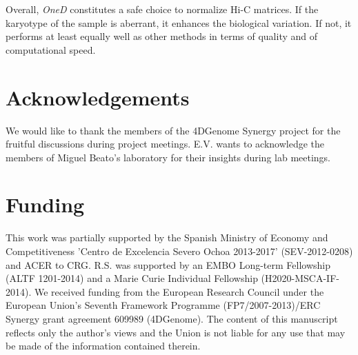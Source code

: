 \documentclass{bioinfo}
\begin{document}
Overall, \textit{OneD} constitutes a safe choice to normalize Hi-C
matrices. If the karyotype of the sample is aberrant, it enhances the
biological variation.  If not, it performs at least equally well as other
methods in terms of quality and of computational speed.


\section*{Acknowledgements}

We would like to thank the members of the 4DGenome Synergy project for the
fruitful discussions during project meetings. E.V. wants to acknowledge
the members of Miguel Beato's laboratory for their insights during lab
meetings.

\section*{Funding}

This work was partially supported by the Spanish Ministry of Economy and
Competitiveness 'Centro de Excelencia Severo Ochoa 2013-2017' (SEV-2012-0208)
and ACER to CRG. R.S. was supported by an EMBO Long-term
Fellowship (ALTF 1201-2014) and a Marie Curie Individual Fellowship
(H2020-MSCA-IF-2014). We received funding from the European Research Council under
the European Union's Seventh Framework Programme (FP7/2007-2013)/ERC Synergy
grant agreement 609989 (4DGenome). The content of this manuscript reflects only
the author’s views and the Union is not liable for any use that may be made of
the information contained therein.

\vspace*{-12pt}



\end{document}
